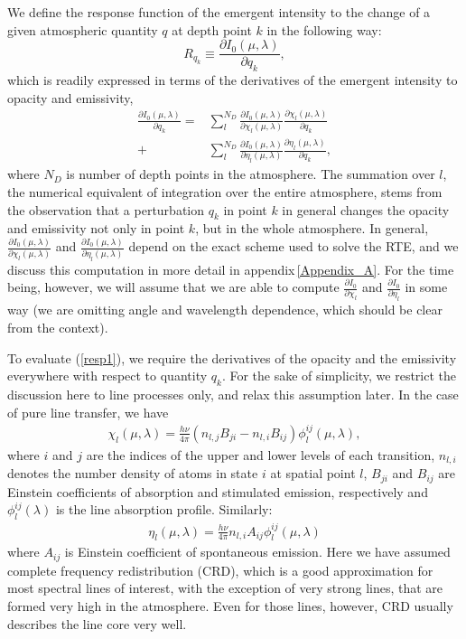 \documentclass{aa}
\begin{document}
We define the response function of the emergent intensity to the change of a given atmospheric quantity $q$ at depth point $k$ in the following way:
\begin{equation}
 R_{q_k} \equiv \frac{\partial I_0(\mu,\lambda)}{\partial q_k},
\end{equation}
which is readily expressed in terms of the derivatives of the emergent intensity to opacity and emissivity, 
\begin{align}
 \frac{\partial I_0(\mu,\lambda)}{\partial q_k} = & \sum_l^{N_D} \frac{\partial I_0(\mu,\lambda)}{\partial \chi_l(\mu,\lambda)} \frac{\partial \chi_l(\mu,\lambda)}{\partial q_k} \nonumber \\
 + & \sum_l^{N_D} \frac{\partial I_0(\mu,\lambda)}{\partial \eta_l(\mu,\lambda)} \frac{\partial \eta_l(\mu,\lambda)}{\partial q_k},
 \label{resp1}
\end{align}
where $N_D$ is number of depth points in the atmosphere. The summation over $l$, the numerical equivalent of integration over the entire atmosphere, stems from the observation that a perturbation $q_k$ in point $k$ in general changes the opacity and emissivity not only in point $k$, but in the whole atmosphere. In general, $\frac{\partial I_0(\mu,\lambda)}{\partial \chi_l(\mu,\lambda)}$ and $\frac{\partial I_0(\mu,\lambda)}{\partial \eta_l(\mu,\lambda)}$ depend on the exact scheme used to solve the RTE, and we discuss this computation in more detail in appendix\,\ref{Appendix_A}. For the time being, however, we will assume that we are able to compute $\frac{\partial I_0}{\partial \chi_l}$ and $\frac{\partial I_0}{\partial \eta_l}$ in some way (we are omitting angle and wavelength dependence, which should be clear from the context).

To evaluate (\ref{resp1}), we require the derivatives of the opacity and the emissivity everywhere with respect to quantity $q_k$. For the sake of simplicity, we restrict the discussion here to line processes only, and relax this assumption later. In the case of pure line transfer, we have
\begin{align}
 \chi_l(\mu,\lambda) = \frac{h\nu}{4\pi}(n_{l,j} B_{ji} - n_{l,i}B_{ij}) \phi^{ij}_l(\mu,\lambda),
\end{align}
where $i$ and $j$ are the indices of the upper and lower levels of each transition, $n_{l,i}$ denotes the number density of atoms in state $i$ at spatial point $l$, $B_{ji}$ and $B_{ij}$ are Einstein coefficients of absorption and stimulated emission, respectively and $\phi^{ij}_l(\lambda)$ is the line absorption profile. Similarly:
\begin{align}
 \eta_l(\mu,\lambda) = \frac{h\nu}{4\pi}n_{l,i}A_{ij} \phi^{ij}_l(\mu,\lambda) 
\end{align}
where $A_{ij}$ is Einstein coefficient of spontaneous emission. Here we have assumed complete frequency redistribution (CRD), which is a good approximation for most spectral lines of interest, with the exception of very strong lines, that are formed very high in the atmosphere. Even for those lines, however, CRD usually describes the line core very well.
\end{document}
